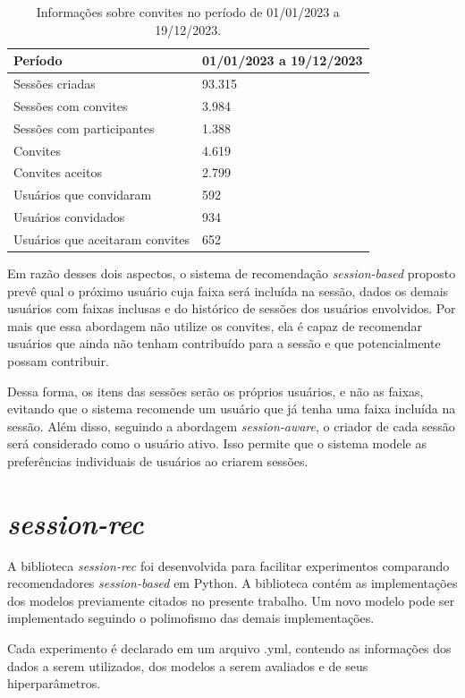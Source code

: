 \begin{table}[htbp]
  \centering
  \begin{tabular}{|l|l|}
    \hline
    \textbf{Período} & 01/01/2023 a 19/12/2023 \\ \hline
    Sessões criadas & 93.315 \\ \hline
    Sessões com convites & 3.984 \\ \hline
    Sessões com participantes & 1.388 \\ \hline
    Convites & 4.619 \\ \hline
    Convites aceitos & 2.799 \\ \hline
    Usuários que convidaram & 592 \\ \hline
    Usuários convidados & 934 \\ \hline
    Usuários que aceitaram convites & 652 \\ \hline
  \end{tabular}
  \caption{Informações sobre convites no período de 01/01/2023 a 19/12/2023.}
  \label{tab_convites}
\end{table}

Em razão desses dois aspectos, o sistema de recomendação \textit{session-based}
proposto prevê qual o próximo usuário cuja faixa será incluída na sessão, dados
os demais usuários com faixas inclusas e do histórico de sessões dos usuários
envolvidos. Por mais que essa abordagem não utilize os convites, ela é capaz de
recomendar usuários que ainda não tenham contribuído para a sessão e que
potencialmente possam contribuir.

Dessa forma, os itens das sessões serão os próprios usuários, e não as faixas,
evitando que o sistema recomende um usuário que já tenha uma faixa incluída na
sessão. Além disso, seguindo a abordagem \textit{session-aware}, o criador de
cada sessão será considerado como o usuário ativo. Isso permite que o sistema
modele as preferências individuais de usuários ao criarem sessões.

\section{\textit{session-rec}} A biblioteca \textit{session-rec} foi
desenvolvida para facilitar experimentos comparando recomendadores
\textit{session-based} em Python. A biblioteca contém as implementações dos
modelos previamente citados no presente trabalho. Um novo modelo pode ser
implementado seguindo o polimofismo das demais implementações.

Cada experimento é declarado em um arquivo .yml, contendo as informações dos
dados a serem utilizados, dos modelos a serem avaliados e de seus hiperparâmetros.

